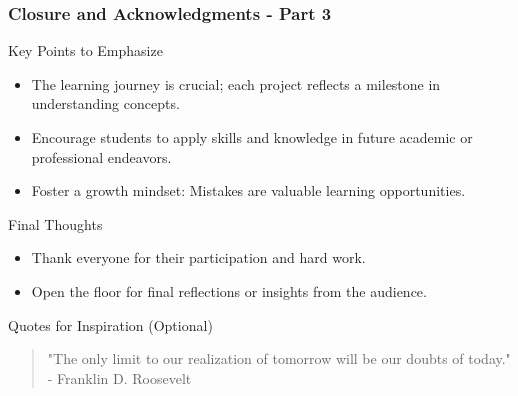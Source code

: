 \documentclass[aspectratio=169]{beamer}
\begin{document}
\begin{frame}[fragile]
    \frametitle{Closure and Acknowledgments - Part 3}
    \begin{block}{Key Points to Emphasize}
        \begin{itemize}
            \item The learning journey is crucial; each project reflects a milestone in understanding concepts.
            \item Encourage students to apply skills and knowledge in future academic or professional endeavors.
            \item Foster a growth mindset: Mistakes are valuable learning opportunities.
        \end{itemize}
    \end{block}
    
    \begin{block}{Final Thoughts}
        \begin{itemize}
            \item Thank everyone for their participation and hard work.
            \item Open the floor for final reflections or insights from the audience.
        \end{itemize}
    \end{block}
    
    \begin{block}{Quotes for Inspiration (Optional)}
        \begin{quote}
            "The only limit to our realization of tomorrow will be our doubts of today." - Franklin D. Roosevelt
        \end{quote}
    \end{block}
\end{frame}
\end{document}
